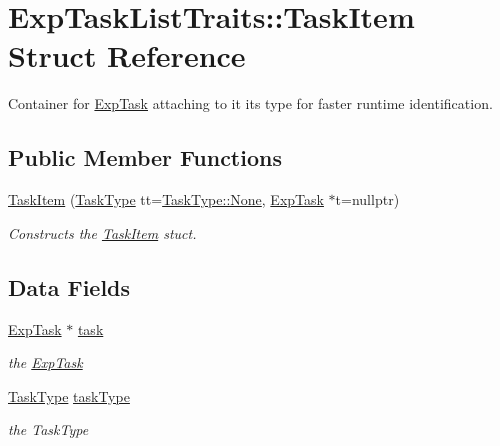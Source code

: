 \hypertarget{struct_exp_task_list_traits_1_1_task_item}{}\section{Exp\+Task\+List\+Traits\+:\+:Task\+Item Struct Reference}
\label{struct_exp_task_list_traits_1_1_task_item}


Container for \hyperlink{class_exp_task}{Exp\+Task} attaching to it its type for faster runtime identification.  


\subsection*{Public Member Functions}
\begin{DoxyCompactItemize}
\item 
\hyperlink{struct_exp_task_list_traits_1_1_task_item_ab8d50b8bac433cef79b948b1341b09e2}{Task\+Item} (\hyperlink{namespace_exp_task_list_traits_adcf9a5159b43c6df6f5e6835170c25b2}{Task\+Type} tt=\hyperlink{namespace_exp_task_list_traits_adcf9a5159b43c6df6f5e6835170c25b2a6adf97f83acf6453d4a6a4b1070f3754}{Task\+Type\+::\+None}, \hyperlink{class_exp_task}{Exp\+Task} $\ast$t=nullptr)
\begin{DoxyCompactList}\small\item\em Constructs the \hyperlink{struct_exp_task_list_traits_1_1_task_item}{Task\+Item} stuct. \end{DoxyCompactList}\end{DoxyCompactItemize}
\subsection*{Data Fields}
\begin{DoxyCompactItemize}
\item 
\hypertarget{struct_exp_task_list_traits_1_1_task_item_ab286c3da7c53f72bff6c045d1796d5f7}{}\hyperlink{class_exp_task}{Exp\+Task} $\ast$ \hyperlink{struct_exp_task_list_traits_1_1_task_item_ab286c3da7c53f72bff6c045d1796d5f7}{task}\label{struct_exp_task_list_traits_1_1_task_item_ab286c3da7c53f72bff6c045d1796d5f7}

\begin{DoxyCompactList}\small\item\em the \hyperlink{class_exp_task}{Exp\+Task} \end{DoxyCompactList}\item 
\hypertarget{struct_exp_task_list_traits_1_1_task_item_a0531e3bff4d273fbf76cd4b65838c78a}{}\hyperlink{namespace_exp_task_list_traits_adcf9a5159b43c6df6f5e6835170c25b2}{Task\+Type} \hyperlink{struct_exp_task_list_traits_1_1_task_item_a0531e3bff4d273fbf76cd4b65838c78a}{task\+Type}\label{struct_exp_task_list_traits_1_1_task_item_a0531e3bff4d273fbf76cd4b65838c78a}

\begin{DoxyCompactList}\small\item\em the Task\+Type \end{DoxyCompactList}\end{DoxyCompactItemize}



